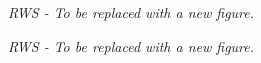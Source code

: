\documentclass{ametsoc}
\begin{document}
\emph{RWS - To be replaced with a new figure.}

\emph{RWS - To be replaced with a new figure.}
\end{document}
